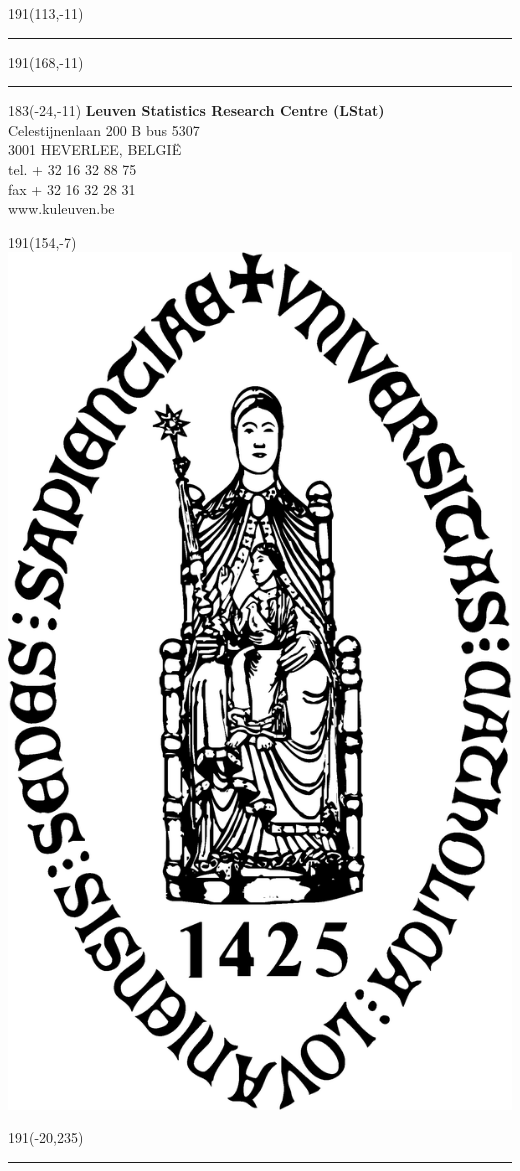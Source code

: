 \documentclass[12pt,a4paper,oneside]{book}
\begin{document}
\thispagestyle{empty}
\sffamily
%
\begin{textblock}{191}(113,-11)
{\color{blueline}\rule{160pt}{5.5pt}}
\end{textblock}
%
\begin{textblock}{191}(168,-11)
{\color{blueline}\rule{5.5pt}{59pt}}
\end{textblock}
%
\begin{textblock}{183}(-24,-11)
\textblockcolour{}
\flushright
\fontsize{7}{7.5}\selectfont
\textbf{Leuven Statistics Research Centre (LStat)}\\
Celestijnenlaan 200 B bus 5307\\
3001 HEVERLEE, BELGI\"{E}\\
tel. + 32 16 32 88 75\\
fax + 32 16 32 28 31\\
www.kuleuven.be\\
\end{textblock}
%
\begin{textblock}{191}(154,-7)
\textblockcolour{}
\includegraphics*[height=16.5truemm]{sedes}
\end{textblock}
%
\begin{textblock}{191}(-20,235)
{\color{bluetitle}\rule{544pt}{55pt}}
\end{textblock}
\end{document}
